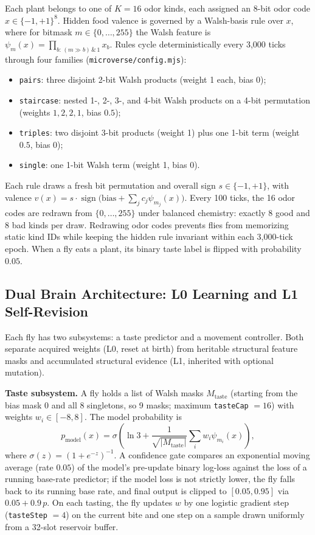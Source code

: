 Each plant belongs to one of $K=16$ odor kinds, each assigned an 8-bit odor code $x \in \{-1,+1\}^8$. Hidden food valence is governed by a Walsh-basis rule over $x$, where for bitmask $m \in \{0,\dots,255\}$ the Walsh feature is $\psi_m(x) = \prod_{b:\, (m \gg b)\,\&\,1} x_b$. Rules cycle deterministically every 3,000 ticks through four families (\texttt{microverse/config.mjs}):
\begin{itemize}
  \item \texttt{pairs}: three disjoint 2-bit Walsh products (weight 1 each, bias 0);
  \item \texttt{staircase}: nested 1-, 2-, 3-, and 4-bit Walsh products on a 4-bit permutation (weights $1,2,2,1$, bias $0.5$);
  \item \texttt{triples}: two disjoint 3-bit products (weight 1) plus one 1-bit term (weight $0.5$, bias 0);
  \item \texttt{single}: one 1-bit Walsh term (weight 1, bias 0).
\end{itemize}
Each rule draws a fresh bit permutation and overall sign $s \in \{-1,+1\}$, with valence $v(x) = s \cdot \operatorname{sign}\!\big(\text{bias} + \sum_j c_j \psi_{m_j}(x)\big)$. Every 100 ticks, the 16 odor codes are redrawn from $\{0,\dots,255\}$ under balanced chemistry: exactly 8 good and 8 bad kinds per draw. Redrawing odor codes prevents flies from memorizing static kind IDs while keeping the hidden rule invariant within each 3,000-tick epoch. When a fly eats a plant, its binary taste label is flipped with probability $0.05$.

\subsection{Dual Brain Architecture: L0 Learning and L1 Self-Revision}

Each fly has two subsystems: a taste predictor and a movement controller. Both separate acquired weights (L0, reset at birth) from heritable structural feature masks and accumulated structural evidence (L1, inherited with optional mutation).

\textbf{Taste subsystem.} A fly holds a list of Walsh masks $M_{\text{taste}}$ (starting from the bias mask $0$ and all 8 singletons, so 9 masks; maximum \texttt{tasteCap} $=16$) with weights $w_i \in [-8,8]$. The model probability is
\[
  p_{\text{model}}(x) = \sigma\!\left(\ln 3 + \frac{1}{\sqrt{|M_{\text{taste}}|}} \sum_{i} w_i \psi_{m_i}(x)\right),
\]
where $\sigma(z) = (1+e^{-z})^{-1}$. A confidence gate compares an exponential moving average (rate $0.05$) of the model's pre-update binary log-loss against the loss of a running base-rate predictor; if the model loss is not strictly lower, the fly falls back to its running base rate, and final output is clipped to $[0.05, 0.95]$ via $0.05 + 0.9\,p$. On each tasting, the fly updates $w$ by one logistic gradient step (\texttt{tasteStep} $=4$) on the current bite and one step on a sample drawn uniformly from a 32-slot reservoir buffer.

